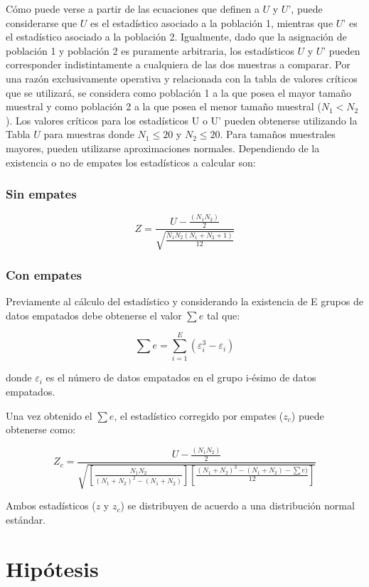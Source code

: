 \documentclass[]{book}
\theoremstyle{definition}
\theoremstyle{definition}
\theoremstyle{definition}
\theoremstyle{remark}
\begin{document}
Cómo puede verse a partir de las ecuaciones que definen a \(U\) y
\(U’\), puede considerarse que \(U\) es el estadístico asociado a la
población 1, mientras que \(U’\) es el estadístico asociado a la
población 2. Igualmente, dado que la asignación de población 1 y
población 2 es puramente arbitraria, los estadísticos \(U\) y \(U’\)
pueden corresponder indistintamente a cualquiera de las dos muestras a
comparar. Por una razón exclusivamente operativa y relacionada con la
tabla de valores críticos que se utilizará, se considera como población
1 a la que posea el mayor tamaño muestral y como población 2 a la que
posea el menor tamaño muestral (\(N_1 < N_2\)). Los valores críticos
para los estadísticos U o U' pueden obtenerse utilizando la Tabla \(U\)
para muestras donde \(N_1\le 20\) y \(N_2\le 20\). Para tamaños
muestrales mayores, pueden utilizarse aproximaciones normales.
Dependiendo de la existencia o no de empates los estadísticos a calcular
son:

\hypertarget{sin-empates-1}{%
\subsubsection{Sin empates}\label{sin-empates-1}}

\[Z=\frac{U-\frac{(N_1 N_2)}{2}}{\sqrt{\frac{N_1 N_2 (N_1+N_2+1)}{12}}}\]

\hypertarget{con-empates}{%
\subsubsection{Con empates}\label{con-empates}}

Previamente al cálculo del estadístico y considerando la existencia de E
grupos de datos empatados debe obtenerse el valor \(\sum e\) tal que:

\[\sum e=\sum_{i=1}^E(\varepsilon_i^3-\varepsilon_i ) \]

donde \(\varepsilon_i\) es el número de datos empatados en el grupo
i-ésimo de datos empatados.

Una vez obtenido el \(\sum e\), el estadístico corregido por empates
(\(z_c\)) puede obtenerse como:

\[Z_c=\frac{U-\frac{(N_1 N_2)}{2}}
{\sqrt{\left [\frac{N_1N_2}{(N_1+N_2)^2-(N_1+N_2)}\right ]\left [\frac{(N_1 + N_2)^3 -(N_1+N_2)-\sum e)}{12}\right ]}}\]

Ambos estadísticos (\(z\) y \(z_c\)) se distribuyen de acuerdo a una
distribución normal estándar.

\hypertarget{hipotesis}{%
\section{Hipótesis}\label{hipotesis}}
\end{document}
